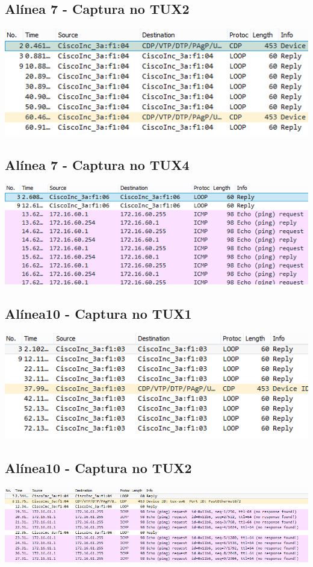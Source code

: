 \documentclass[11pt,a4paper,reqno]{report}
\numberwithin{equation}{section}
\begin{document}
\begin{appendices}
\subsection{Alínea 7 - Captura no TUX2}
\label{ex2_tux1ping_tux2}
\includegraphics[width=18cm]{ex2_a7_tux2.png}
\subsection{Alínea 7 - Captura no TUX4}
\label{ex2_tux1ping_tux4}
\includegraphics[width=18cm]{ex2_a7_tux4.png}

\subsection{Alínea10 - Captura no TUX1}
\includegraphics[width=18cm]{ex2_a10_tux1.png}
\subsection{Alínea10 - Captura no TUX2}
\includegraphics[width=18cm]{ex2_a10_tux2.png}

\end{appendices}
\end{document}

